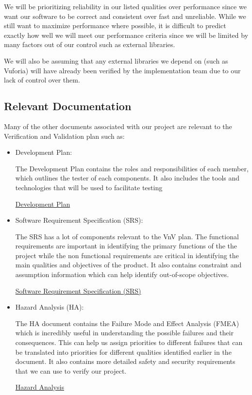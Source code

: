 \documentclass[12pt, titlepage]{article}
\begin{document}
We will be prioritizing reliability in our listed qualities over performance since we want our software to be correct and consistent over fast and unreliable. While we still want to maximize performance where possible, it is difficult to predict exactly how well we will meet our performance criteria since we will be limited by many factors out of our control such as external libraries.

We will also be assuming that any external libraries we depend on (such as Vuforia) will have already been verified by the implementation team due to our lack of control over them. 


\subsection{Relevant Documentation}





Many of the other documents associated with our project are relevant to the Verification and Validation plan such as:

\begin{itemize}
	\item Development Plan:

	The Development Plan contains the roles and responsibilities of each member, which outlines the tester of each components. It also includes the tools and technologies that will be used to facilitate testing

	\href{https://github.com/beatlepie/4G06CapstoneProjectTeam2/blob/docs-VnV-plan/docs/DevelopmentPlan/DevelopmentPlan.pdf}{Development Plan}
    \item Software Requirement Specification (SRS):
          
          The SRS has a lot of components relevant to the VnV plan. The functional requirements are important in identifying the primary functions of the the project while the non functional requirements are critical in identifying the main qualities and objectives of the product. It also contains constraint and assumption information which can help identify out-of-scope objectives.

          \href{https://github.com/beatlepie/4G06CapstoneProjectTeam2/blob/docs-VnV-plan/docs/SRS-Volere/SRS.pdf}{Software Requirement Specification (SRS)}
    \item Hazard Analysis (HA):
    
        The HA document contains the Failure Mode and Effect Analysis (FMEA) which is incredibly useful in understanding the possible failures and their consequences. This can help us assign priorities to different failures that can be translated into priorities for different qualities identified earlier in the document. It also contains more detailed safety and security requirements that we can use to verify our project.

        \href{https://github.com/beatlepie/4G06CapstoneProjectTeam2/blob/docs-VnV-plan/docs/HazardAnalysis/HazardAnalysis.pdf}{Hazard Analysis}
\end{itemize}
\end{document}
